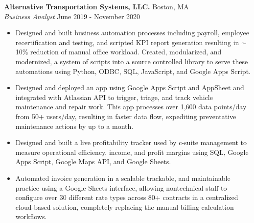\documentclass[a4paper]{article}
\begin{document}
\textbf{Alternative Transportation Systems, LLC.} \hfill Boston, MA\\
\textit{Business Analyst} \hfill June 2019 - November 2020\\
\vspace{-1mm}
\begin{itemize} \itemsep 1pt
	\item Designed and built business automation processes including payroll, employee recertification and testing, and scripted KPI report generation resulting in $\sim$10\% reduction of manual office workload. 
    Created, modularized, and modernized, a system of scripts into a source controlled library to serve these automations using Python, ODBC, SQL, JavaScript, and Google Apps Script.
	\item Designed and deployed an app using Google Apps Script and AppSheet and integrated with Atlassian API to trigger, triage, and track vehicle maintenance and repair work. This app processes over 1,600 data points/day from 50+ users/day, resulting in faster data flow, expediting preventative maintenance actions by up to a month.
	\item Designed and built a live profitability tracker used by c-suite management to measure operational efficiency, income, and profit margins using SQL, Google Apps Script, Google Maps API, and Google Sheets.
	\item Automated invoice generation in a scalable trackable, and maintainable practice using a Google Sheets interface, allowing nontechnical staff to configure over 30 different rate types across 80+ contracts in a centralized cloud-based solution, completely replacing the manual billing calculation workflows.
\end{itemize}
\end{document}
